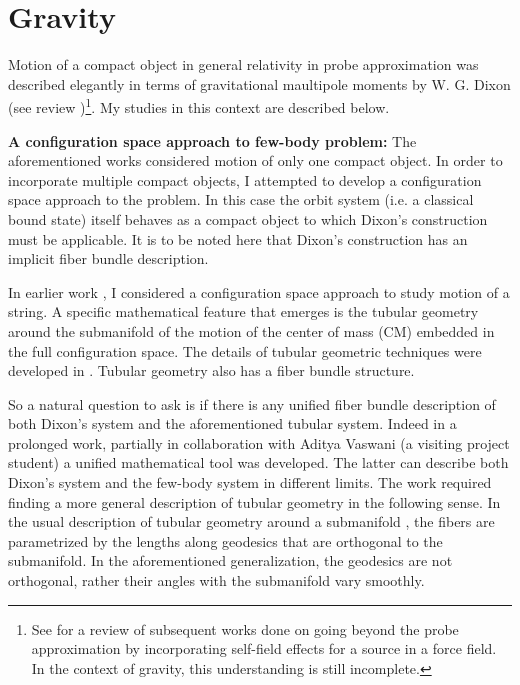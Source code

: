 \documentclass[
article,12pt]{article}
\begin{document}
\section{Gravity}
Motion of a compact object in general relativity in probe approximation was described elegantly in terms of gravitational maultipole moments by W. G. Dixon (see review \cite{dixon-rev})\footnote{See \cite{harte} for a review of subsequent works done on going beyond the probe approximation by incorporating self-field effects for a source in a force field. In the context of gravity, this understanding is still incomplete. }. My studies in this context are described below.  

\vspace{.1in}
\noindent
\textbf{A configuration space approach to few-body problem:} The aforementioned works \cite{dixon-rev, harte} considered motion of only one compact object. In order to incorporate multiple compact objects, I attempted to develop a configuration space approach to the problem. In this case the orbit system (i.e. a classical bound state) itself behaves as a compact object to which Dixon's construction must be applicable. It is to be noted here that Dixon's construction has an implicit fiber bundle description. 

In earlier work \cite{semi-classical}, I considered a configuration space approach to study motion of a string. A specific mathematical feature that emerges is the tubular geometry around the submanifold of the motion of the center of mass (CM) embedded in the full configuration space. The details of tubular geometric techniques were developed in \cite{tubular, tubular-gen}. Tubular geometry also has a fiber bundle structure. 

So a natural question to ask is if there is any unified fiber bundle description of both Dixon's system and the aforementioned tubular system. Indeed in a prolonged work, partially in collaboration with Aditya Vaswani (a visiting project student) a unified mathematical tool was developed.  The latter can describe both Dixon's system and the few-body system in different limits. The work required finding a more general description of tubular geometry in the following sense. In the usual description of tubular geometry around a submanifold \cite{tubular}, the fibers are parametrized by the lengths along geodesics that are orthogonal to the submanifold. In the aforementioned generalization, the geodesics are not orthogonal, rather their angles with the submanifold vary smoothly. 
\end{document}
